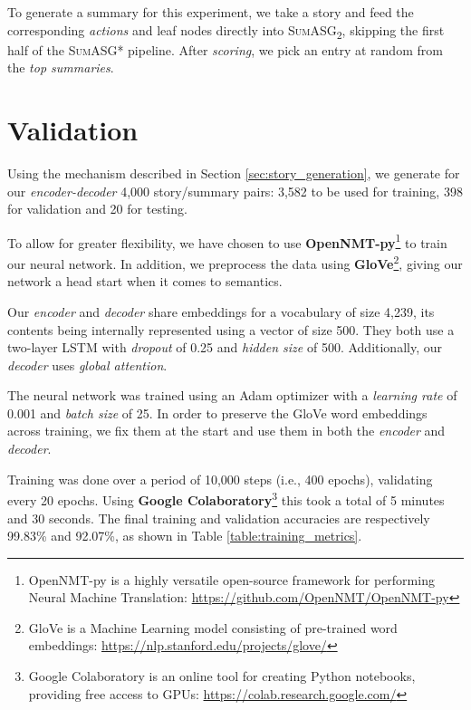 To generate a summary for this experiment, we take a story and feed the corresponding \textit{actions} and leaf nodes directly into \textsc{SumASG\textsubscript{2}}, skipping the first half of the \textsc{SumASG*} pipeline. After \textit{scoring}, we pick an entry at random from the \textit{top summaries}.

\section{Validation}
\label{sec:validation}

Using the mechanism described in Section \ref{sec:story_generation}, we generate for our \textit{encoder-decoder} 4,000 story/summary pairs: 3,582 to be used for training, 398 for validation and 20 for testing.

To allow for greater flexibility, we have chosen to use \textbf{OpenNMT-py}\footnote{OpenNMT-py is a highly versatile open-source framework for performing Neural Machine Translation: \url{https://github.com/OpenNMT/OpenNMT-py}} to train our neural network. In addition, we preprocess the data using \textbf{GloVe}\footnote{GloVe is a Machine Learning model consisting of pre-trained word embeddings: \url{https://nlp.stanford.edu/projects/glove/}}, giving our network a head start when it comes to semantics.

Our \textit{encoder} and \textit{decoder} share embeddings for a vocabulary of size 4,239, its contents being internally represented using a vector of size 500. They both use a two-layer LSTM with \textit{dropout} of 0.25 and \textit{hidden size} of 500. Additionally, our \textit{decoder} uses \textit{global attention}.

The neural network was trained using an Adam optimizer with a \textit{learning rate} of 0.001 and \textit{batch size} of 25. In order to preserve the GloVe word embeddings across training, we fix them at the start and use them in both the \textit{encoder} and \textit{decoder}.

Training was done over a period of 10,000 steps (i.e., 400 epochs), validating every 20 epochs. Using \textbf{Google Colaboratory}\footnote{Google Colaboratory is an online tool for creating Python notebooks, providing free access to GPUs: \url{https://colab.research.google.com/}} this took a total of 5 minutes and 30 seconds. The final training and validation accuracies are respectively 99.83\% and 92.07\%, as shown in Table \ref{table:training_metrics}.

